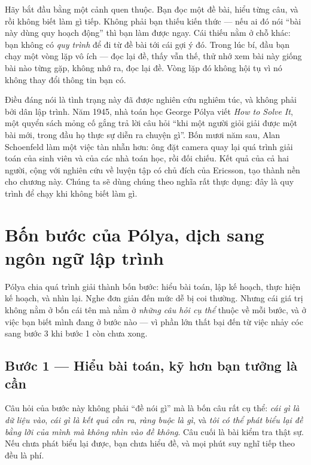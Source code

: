 \documentclass[../../algorithm.tex]{subfiles}
\begin{document}
Hãy bắt đầu bằng một cảnh quen thuộc. Bạn đọc một đề bài, hiểu từng câu, và rồi không biết làm gì tiếp. Không phải bạn thiếu kiến thức --- nếu ai đó nói ``bài này dùng quy hoạch động'' thì bạn làm được ngay. Cái thiếu nằm ở chỗ khác: bạn không có \emph{quy trình} để đi từ đề bài tới cái gợi ý đó. Trong lúc bí, đầu bạn chạy một vòng lặp vô ích --- đọc lại đề, thấy vẫn thế, thử nhớ xem bài này giống bài nào từng gặp, không nhớ ra, đọc lại đề. Vòng lặp đó không hội tụ vì nó không thay đổi thông tin bạn có.

Điều đáng nói là tình trạng này đã được nghiên cứu nghiêm túc, và không phải bởi dân lập trình. Năm 1945, nhà toán học George Pólya viết \emph{How to Solve It}\cite{polya1945}, một quyển sách mỏng cố gắng trả lời câu hỏi ``khi một người giỏi giải được một bài mới, trong đầu họ thực sự diễn ra chuyện gì''. Bốn mươi năm sau, Alan Schoenfeld làm một việc tàn nhẫn hơn: ông đặt camera quay lại quá trình giải toán của sinh viên và của các nhà toán học, rồi đối chiếu\cite{schoenfeld1985}. Kết quả của cả hai người, cộng với nghiên cứu về luyện tập có chủ đích của Ericsson\cite{ericsson1993}, tạo thành nền cho chương này. Chúng ta sẽ dùng chúng theo nghĩa rất thực dụng: đây là quy trình để chạy khi không biết làm gì.

\section{Bốn bước của Pólya, dịch sang ngôn ngữ lập trình}

Pólya chia quá trình giải thành bốn bước: hiểu bài toán, lập kế hoạch, thực hiện kế hoạch, và nhìn lại. Nghe đơn giản đến mức dễ bị coi thường. Nhưng cái giá trị không nằm ở bốn cái tên mà nằm ở \emph{những câu hỏi cụ thể} thuộc về mỗi bước, và ở việc bạn biết mình đang ở bước nào --- vì phần lớn thất bại đến từ việc nhảy cóc sang bước 3 khi bước 1 còn chưa xong.

\subsection{Bước 1 --- Hiểu bài toán, kỹ hơn bạn tưởng là cần}

Câu hỏi của bước này không phải ``đề nói gì'' mà là bốn câu rất cụ thể: \emph{cái gì là dữ liệu vào}, \emph{cái gì là kết quả cần ra}, \emph{ràng buộc là gì}, và \emph{tôi có thể phát biểu lại đề bằng lời của mình mà không nhìn vào đề không}. Câu cuối là bài kiểm tra thật sự. Nếu chưa phát biểu lại được, bạn chưa hiểu đề, và mọi phút suy nghĩ tiếp theo đều là phí.
\end{document}
